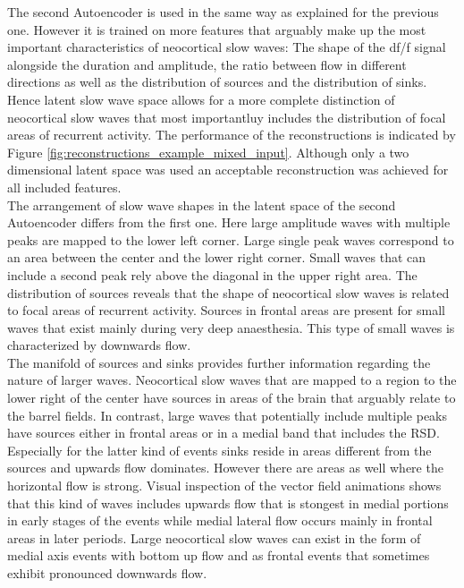 The second Autoencoder is used in the same way as explained for the previous one. However it is trained on more features that arguably make up the most important characteristics of neocortical slow waves: The shape of the df/f signal alongside the duration and amplitude, the ratio between flow in different directions as well as the distribution of sources and the distribution of sinks. Hence latent slow wave space allows for a more complete distinction of neocortical slow waves that most importantluy includes the distribution of focal areas of recurrent activity. The performance of the reconstructions is indicated by Figure \ref{fig:reconstructions_example_mixed_input}. Although only a two dimensional latent space was used an acceptable reconstruction was achieved for all included features.\\
The arrangement of slow wave shapes in the latent space of the second Autoencoder differs from the first one. Here large amplitude waves with multiple peaks are mapped to the lower left corner. Large single peak waves correspond to an area between the center and the lower right corner. Small waves that can include a second peak rely above the diagonal in the upper right area. The distribution of sources reveals that the shape of neocortical slow waves is related to focal areas of recurrent activity. Sources in frontal areas are present for small waves that exist mainly during very deep anaesthesia. This type of small waves is characterized by downwards flow.\\
The manifold of sources and sinks provides further information regarding the nature of larger waves. Neocortical slow waves that are mapped to a region to the lower right of the center have sources in areas of the brain that arguably relate to the barrel fields. In contrast, large waves that potentially include multiple peaks have sources either in frontal areas or in a medial band that includes the RSD. Especially for the latter kind of events sinks reside in areas different from the sources and upwards flow dominates. However there are areas as well where the horizontal flow is strong. Visual inspection of the vector field animations shows that this kind of waves includes upwards flow that is stongest in medial portions in early stages of the events while medial lateral flow occurs mainly in frontal areas in later periods. Large neocortical slow waves can exist in the form of medial axis events with bottom up flow and as frontal events that sometimes exhibit pronounced downwards flow. \\
